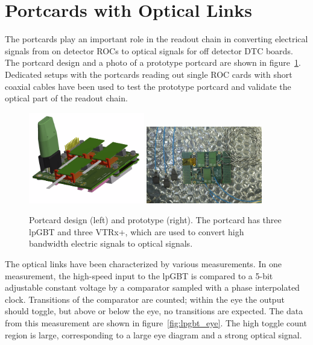 \documentclass[a4paper,11pt]{article}
\newcommand{\vtrxp}{VTRx+}
\begin{document}
\section{Portcards with Optical Links}
\label{sec:optical}

The portcards play an important role in the readout chain in converting electrical signals from on detector ROCs to optical signals for off detector DTC boards.
The portcard design and a photo of a prototype portcard are shown in figure~\ref{fig:port_card}.
Dedicated setups with the portcards reading out single ROC cards with short coaxial cables have been used to test the prototype portcard and validate the optical part of the readout chain.

\begin{figure}[htbp]
\centering
\includegraphics[width=0.45\textwidth,origin=c]{../figures/port_card_design.png}
\qquad
\includegraphics[width=0.45\textwidth,origin=c]{../figures/port_card_back.jpeg}
\caption{
\label{fig:port_card}
Portcard design (left) and prototype (right).
The portcard has three lpGBT and three \vtrxp, which are used to convert high bandwidth electric signals to optical signals.
}
\end{figure}


The optical links have been characterized by various measurements.
In one measurement, the high-speed input to the lpGBT is compared to a 5-bit adjustable constant voltage by a comparator sampled with a phase interpolated clock.
Transitions of the comparator are counted; within the eye the output should toggle, but above or below the eye, no transitions are expected.
The data from this measurement are shown in figure~\ref{fig:lpgbt_eye}.
The high toggle count region is large, corresponding to a large eye diagram and a strong optical signal.
\end{document}
